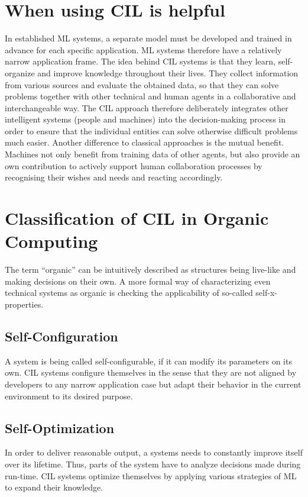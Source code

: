 \documentclass[conference]{IEEEtran}
\begin{document}
\section{When using CIL is helpful}\label{AdvantageOfCIL}
In established ML systems, a separate model must be developed and trained in advance for 
each specific application. ML systems therefore have a relatively narrow application frame. 
The idea behind CIL systems is that they learn, self-organize and improve knowledge throughout their lives. 
They collect information from various sources and evaluate the obtained data, so that they 
can solve problems together with other technical and human agents in a 
collaborative and interchangeable way\cite{CIL:sick}.
The CIL approach therefore deliberately integrates other intelligent systems 
(people and machines) into the decision-making process in order to ensure that the individual entities 
can solve otherwise difficult problems much easier.
Another difference to classical approaches is the mutual benefit. 
Machines not only benefit from training data of other agents, but also provide 
an own contribution to actively support human collaboration processes by 
recognising their wishes and needs and reacting accordingly\cite{CIL:sick}.

\section{Classification of CIL in Organic Computing}
The term ``organic'' can be intuitively described as structures being live-like and making decisions on their own. 
A more formal way of characterizing even technical systems as organic is checking the applicability of 
so-called self-x-properties\cite{Organic:schloer}\cite{Organic:schmeck}.

\subsection{Self-Configuration}
A system is being called self-configurable, if it can modify its parameters on its own.
CIL systems configure themselves in the sense that they are not aligned by developers to any narrow application 
case but adapt their behavior in the current environment to its desired purpose.

\subsection{Self-Optimization}
In order to deliver reasonable output, a systems needs to constantly improve itself over its lifetime. Thus, parts of 
the system have to analyze decisions made during run-time.
CIL systems optimize themselves by applying various strategies of ML to expand their knowledge.
\end{document}
